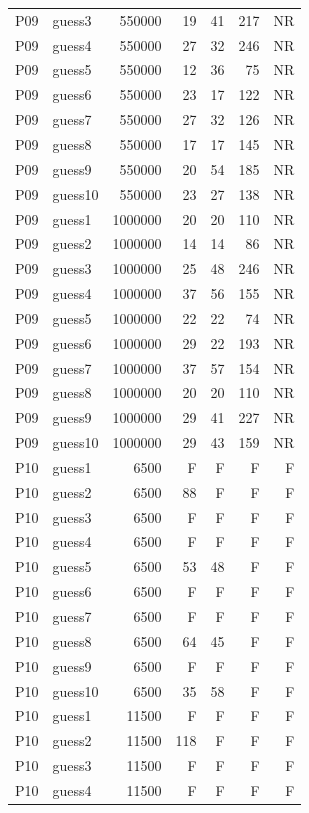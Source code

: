 {\begin{longtable}{llrrrrr}
P09 & guess3 & 550000 & 19 & 41 & 217 & NR \\
P09 & guess4 & 550000 & 27 & 32 & 246 & NR \\
P09 & guess5 & 550000 & 12 & 36 & 75 & NR \\
P09 & guess6 & 550000 & 23 & 17 & 122 & NR \\
P09 & guess7 & 550000 & 27 & 32 & 126 & NR \\
P09 & guess8 & 550000 & 17 & 17 & 145 & NR \\
P09 & guess9 & 550000 & 20 & 54 & 185 & NR \\
P09 & guess10 & 550000 & 23 & 27 & 138 & NR \\
P09 & guess1 & 1000000 & 20 & 20 & 110 & NR \\
P09 & guess2 & 1000000 & 14 & 14 & 86 & NR \\
P09 & guess3 & 1000000 & 25 & 48 & 246 & NR \\
P09 & guess4 & 1000000 & 37 & 56 & 155 & NR \\
P09 & guess5 & 1000000 & 22 & 22 & 74 & NR \\
P09 & guess6 & 1000000 & 29 & 22 & 193 & NR \\
P09 & guess7 & 1000000 & 37 & 57 & 154 & NR \\
P09 & guess8 & 1000000 & 20 & 20 & 110 & NR \\
P09 & guess9 & 1000000 & 29 & 41 & 227 & NR \\
P09 & guess10 & 1000000 & 29 & 43 & 159 & NR \\
P10 & guess1 & 6500 & F & F & F & F \\
P10 & guess2 & 6500 & 88 & F & F & F \\
P10 & guess3 & 6500 & F & F & F & F \\
P10 & guess4 & 6500 & F & F & F & F \\
P10 & guess5 & 6500 & 53 & 48 & F & F \\
P10 & guess6 & 6500 & F & F & F & F \\
P10 & guess7 & 6500 & F & F & F & F \\
P10 & guess8 & 6500 & 64 & 45 & F & F \\
P10 & guess9 & 6500 & F & F & F & F \\
P10 & guess10 & 6500 & 35 & 58 & F & F \\
P10 & guess1 & 11500 & F & F & F & F \\
P10 & guess2 & 11500 & 118 & F & F & F \\
P10 & guess3 & 11500 & F & F & F & F \\
P10 & guess4 & 11500 & F & F & F & F \\

\end{longtable}}
